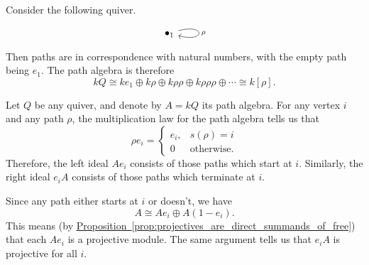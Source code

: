 \documentclass[main.tex]{subfiles}
\begin{document}
\begin{example}
  Consider the following quiver.
  \begin{equation*}
    \begin{tikzcd}
      \bullet_{1}
      \arrow[loop right, looseness=15, "\rho"]
    \end{tikzcd}
  \end{equation*}
  Then paths are in correspondence with natural numbers, with the empty path being $e_{1}$. The path algebra is therefore
  \begin{equation*}
    kQ \cong ke_{1} \oplus k\rho \oplus k\rho\rho \oplus k\rho\rho\rho \oplus \cdots \cong k[\rho].
  \end{equation*}
\end{example}
\begin{example}
  \label{eg:left_ideals_of_path_algebra_are_projective}
  Let $Q$ be any quiver, and denote by $A = kQ$ its path algebra. For any vertex $i$ and any path $\rho$, the multiplication law for the path algebra tells us that
  \begin{equation*}
    \rho e_{i} =
    \begin{cases}
      e_{i}, & s(\rho) = i \\
      0 & \text{otherwise}.
    \end{cases}
  \end{equation*}
  Therefore, the left ideal $A e_{i}$ consists of those paths which start at $i$. Similarly, the right ideal $e_{i} A$ consists of those paths which terminate at $i$.

  Since any path either starts at $i$ or doesn't, we have
  \begin{equation*}
    A \cong Ae_{i} \oplus A(1 - e_{i}).
  \end{equation*}
  This means (by \hyperref[prop:projectives_are_direct_summands_of_free]{Proposition~\ref*{prop:projectives_are_direct_summands_of_free}}) that each $Ae_{i}$ is a projective module. The same argument tells us that $e_{i}A$ is projective for all $i$.
\end{example}
\end{document}
